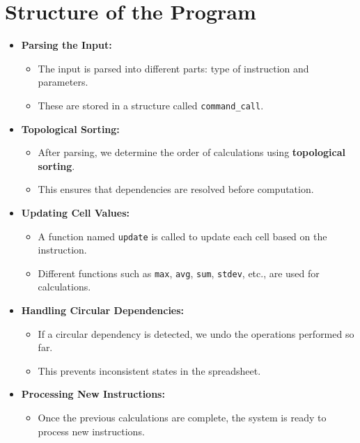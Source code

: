 \documentclass{article}
\begin{document}
\section{Structure of the Program}
\begin{itemize}
    \item \textbf{Parsing the Input:}
    \begin{itemize}
        \item The input is parsed into different parts: type of instruction and parameters.
        \item These are stored in a structure called \texttt{command\_call}.
    \end{itemize}
    
    \item \textbf{Topological Sorting:}
    \begin{itemize}
        \item After parsing, we determine the order of calculations using \textbf{topological sorting}.
        \item This ensures that dependencies are resolved before computation.
    \end{itemize}
    
    \item \textbf{Updating Cell Values:}
    \begin{itemize}
        \item A function named \texttt{update} is called to update each cell based on the instruction.
        \item Different functions such as \texttt{max}, \texttt{avg}, \texttt{sum}, \texttt{stdev}, etc., are used for calculations.
    \end{itemize}
    
    \item \textbf{Handling Circular Dependencies:}
    \begin{itemize}
        \item If a circular dependency is detected, we undo the operations performed so far.
        \item This prevents inconsistent states in the spreadsheet.
    \end{itemize}
    
    \item \textbf{Processing New Instructions:}
    \begin{itemize}
        \item Once the previous calculations are complete, the system is ready to process new instructions.
    \end{itemize}
\end{itemize}
\end{document}
